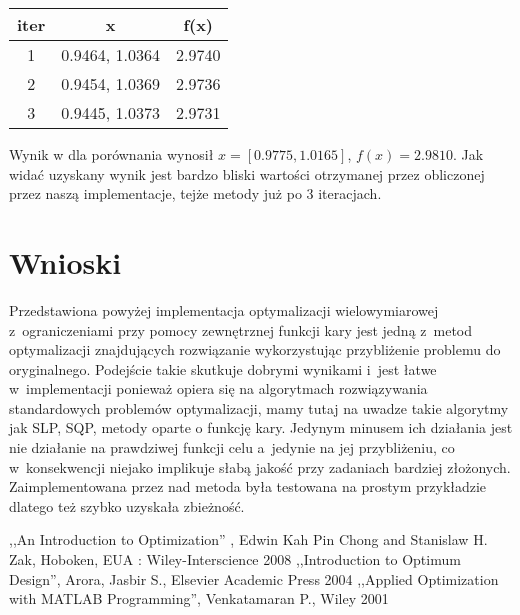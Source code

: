 \documentclass{classrep}
\begin{document}
\begin{center}
\begin{tabular}{|c|c|c|}
\hline 
iter & x & f(x)\\
\hline
1 & 0.9464, 1.0364 & 2.9740\\ 
\hline 
2 &  0.9454, 1.0369 & 2.9736\\ 
\hline 
3 & 0.9445, 1.0373 & 2.9731\\ 
\hline 
\end{tabular} 
\end{center}


Wynik w \cite{2} dla porównania wynosił $x=[0.9775, 1.0165]$, $f(x)=2.9810$.
Jak widać uzyskany wynik jest bardzo bliski wartości otrzymanej przez obliczonej przez naszą implementacje, tejże metody już po 3 iteracjach.

\section{Wnioski}
Przedstawiona powyżej implementacja optymalizacji wielowymiarowej z~ograniczeniami przy pomocy zewnętrznej funkcji kary jest jedną z~metod optymalizacji znajdujących rozwiązanie wykorzystując przybliżenie problemu do oryginalnego. Podejście takie skutkuje dobrymi wynikami i~jest łatwe w~implementacji ponieważ opiera się na algorytmach rozwiązywania standardowych problemów optymalizacji, mamy tutaj na uwadze takie algorytmy jak SLP, SQP, metody oparte o funkcję kary. Jedynym minusem ich działania jest nie działanie na prawdziwej funkcji celu a~jedynie na jej przybliżeniu, co w~konsekwencji niejako implikuje słabą jakość przy zadaniach bardziej złożonych. Zaimplementowana przez nad metoda była testowana na prostym przykładzie dlatego też szybko uzyskała zbieżność.

\begin{thebibliography}{9}
 ,,An Introduction to Optimization'' , Edwin Kah Pin Chong and Stanislaw H. Zak, Hoboken, EUA : Wiley-Interscience 2008
 ,,Introduction to Optimum Design'', Arora, Jasbir S., Elsevier Academic Press 2004
 ,,Applied Optimization with MATLAB Programming'', Venkatamaran P., Wiley 2001
\end{thebibliography}
\end{document}
